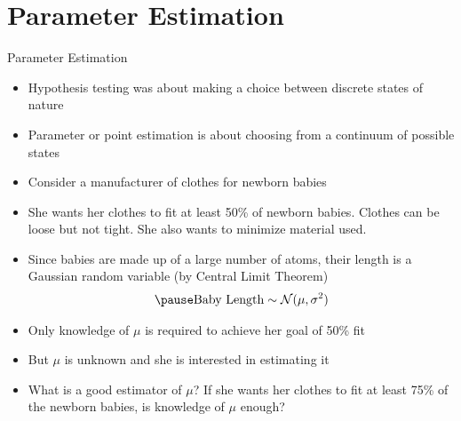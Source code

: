 \documentclass[t]{beamer}
\begin{document}
\section{Parameter Estimation}
\begin{frame}{Parameter Estimation}
  \footnotesize
  \begin{itemize}
    \item \pause Hypothesis testing was about making a choice between discrete states of nature
    \item \pause Parameter or point estimation is about choosing from a continuum of possible states
  \end{itemize}
  \pause
  \begin{example}[]
    \begin{itemize}
      \item \pause Consider a manufacturer of clothes for newborn babies
      \item \pause She wants her clothes to fit at least 50\% of newborn babies. \pause Clothes can be loose but not tight. \pause She also wants to minimize material used.
      \item \pause Since babies are made up of a large number of atoms, \pause their length is a Gaussian random variable \pause (by Central Limit Theorem)
        \begin{eqnarray*}
          \pause \text{Baby Length} \sim \mathcal{N}(\mu, \sigma^2)
        \end{eqnarray*}
      \item \pause Only knowledge of $\mu$ is required to achieve her goal of 50\% fit
      \item \pause But $\mu$ is unknown and she is interested in estimating it
      \item \pause What is a good estimator of $\mu$? \pause If she wants her clothes to fit at least 75\% of the newborn babies, is knowledge of $\mu$ enough?
    \end{itemize}
  \end{example}
  \normalsize
\end{frame}
\end{document}
